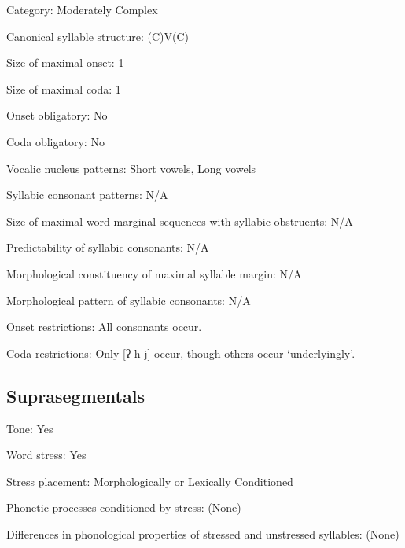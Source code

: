{\begin{appendixdesc}
\item[Category:] Moderately Complex

\item[Canonical syllable structure:] (C)V(C) \citep[143--153]{Rice1989}

\item[Size of maximal onset:] 1

\item[Size of maximal coda:] 1

\item[Onset obligatory:] No

\item[Coda obligatory:] No

\item[Vocalic nucleus patterns:] Short vowels, Long vowels

\item[Syllabic consonant patterns:] N/A

\item[Size of maximal word-marginal sequences with syllabic obstruents:] N/A

\item[Predictability of syllabic consonants:] N/A

\item[Morphological constituency of maximal syllable margin:] N/A

\item[Morphological pattern of syllabic consonants:] N/A

\item[Onset restrictions:] All consonants occur.

\item[Coda restrictions:] Only [ʔ h j] occur, though others occur ‘underlyingly’.
\end{appendixdesc}
\subsection*{Suprasegmentals}
\begin{appendixdesc}
\item[Tone:] Yes

\item[Word stress:] Yes

\item[Stress placement:] Morphologically or Lexically Conditioned

\item[Phonetic processes conditioned by stress:] (None)

\item[Differences in phonological properties of stressed and unstressed syllables:] (None)


\end{appendixdesc}}
